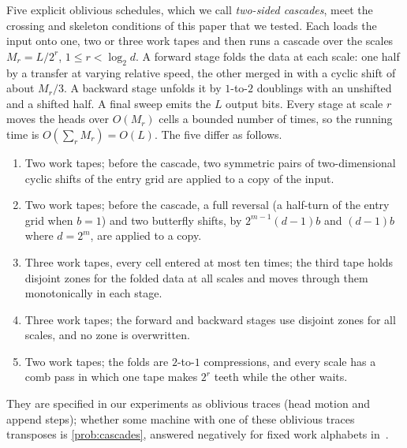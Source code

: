 Five explicit oblivious schedules, which we call \emph{two-sided cascades}, meet the crossing and skeleton conditions of this paper that we
tested. Each loads
the input onto one, two or three work tapes and then runs a cascade over the scales $M_r=L/2^r$, $1\le r<\log_2d$. A forward
stage folds the data at each scale: one half by a transfer at varying relative speed, the other merged in with a cyclic shift of about
$M_r/3$. A backward stage unfolds it by $1$-to-$2$ doublings with an unshifted and a shifted half. A final sweep emits the $L$ output bits.
Every stage at scale $r$ moves the heads over $O(M_r)$ cells a bounded number of times, so the running time is $O(\sum_rM_r)=O(L)$. The five
differ as follows.
\begin{enumerate}[leftmargin=2em]
\item Two work tapes; before the cascade, two symmetric pairs of two-dimensional cyclic shifts of the entry grid are applied to a copy of
the input.
\item Two work tapes; before the cascade, a full reversal (a half-turn of the entry grid when $b=1$) and two butterfly shifts, by
$2^{m-1}(d-1)b$ and $(d-1)b$ where $d=2^m$, are applied to a copy.
\item Three work tapes, every cell entered at most ten times; the third tape holds disjoint zones for the folded data at all scales and
moves through them monotonically in each stage.
\item Three work tapes; the forward and backward stages use disjoint zones for all scales, and no zone is overwritten.
\item Two work tapes; the folds are $2$-to-$1$ compressions, and every scale has a comb pass in which one tape makes $2^r$ teeth while the
other waits.
\end{enumerate}
They are specified in our experiments as oblivious traces (head motion and append steps); whether some machine with one of these oblivious
traces transposes is \cref{prob:cascades}, answered negatively for fixed work alphabets in~\cite{CascadeObstructionMemo2026}.

